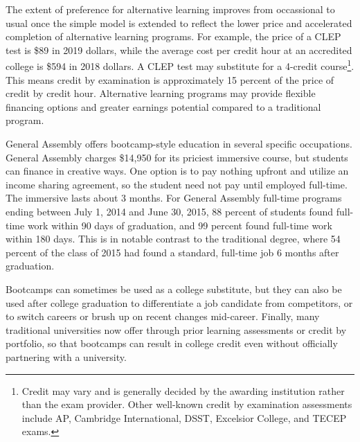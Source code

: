 \documentclass[AER]{./aea-latex-templates/AEA}
\begin{document}
The extent of preference for alternative learning improves from
occassional to usual once the simple model is extended to reflect the
lower price and accelerated completion of alternative learning programs.
For example, the price of a CLEP test is \$89 in 2019 dollars\cite{collegeboard_2019}, while
the average cost per credit hour at an accredited college is \$594 in 2018
dollars\cite{kirkham2018study}. A CLEP test may substitute for a 4-credit course\footnote{Credit
may vary and is generally decided by the awarding institution rather than
the exam provider. Other well-known credit by examination assessments include AP, Cambridge International, DSST, Excelsior
College, and TECEP exams.}. This means credit by examination is approximately 15 percent of the price of credit by credit hour.
Alternative learning programs may provide flexible financing options and greater earnings potential compared to a traditional program.

General Assembly offers bootcamp-style education in several specific occupations. General Assembly
charges \$14,950 for its priciest immersive course, but students
can finance in creative ways. One option is to pay nothing upfront and utilize an income sharing
agreement, so the student need not pay until employed full-time\cite{ga2019}.
The immersive lasts about 3 months. For General Assembly
full-time programs ending between July 1, 2014 and June 30, 2015, 88 percent of students found full-time
work within 90 days of graduation, and 99 percent found full-time work within 180
days\cite{kirkham_2017}. This is in notable contrast to the traditional degree, where 54 percent of
the class of 2015 had found a standard, full-time job 6 months after
graduation\cite{wexler_2016}.

Bootcamps can sometimes be used as a college substitute, but they can also
be used after college graduation to differentiate a job candidate from
competitors, or to switch careers or brush up on recent changes
mid-career. Finally, many traditional universities now offer through prior
learning assessments or credit by portfolio, so that bootcamps can result
in college credit even without officially partnering with a university\cite{aceposttraditionallearners}.
\end{document}
